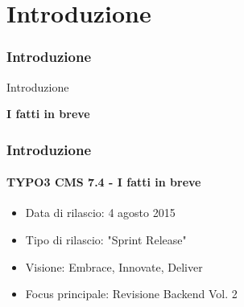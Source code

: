 %

\section{Introduzione}
\begin{frame}[fragile]
	\frametitle{Introduzione}

	\begin{center}\huge{Introduzione}\end{center}
	\begin{center}\huge{\color{typo3darkgrey}\textbf{I fatti in breve}}\end{center}

\end{frame}

\begin{frame}[fragile]
	\frametitle{Introduzione}
	\framesubtitle{TYPO3 CMS 7.4 - I fatti in breve}

	\begin{itemize}
		\item Data di rilascio: 4 agosto 2015
		\item Tipo di rilascio: "Sprint Release"
		\item Visione: Embrace, Innovate, Deliver
		\item Focus principale: Revisione Backend Vol. 2
	\end{itemize}

\end{frame}

